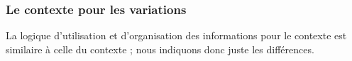 \documentclass[12pt, a4paper]{article}
\begin{document}

\subsubsection{Le contexte  pour les variations}

La logique d'utilisation et d'organisation des informations pour le contexte  est similaire à celle du contexte  ; nous indiquons donc juste les différences.
%
\end{document}
